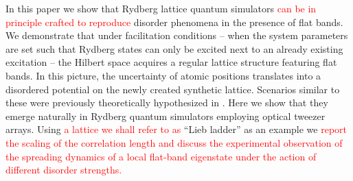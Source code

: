 \documentclass[prl,aps,twocolumn,showpacs,superscriptaddress,longbibliography]{revtex4-1}
\newcommand{\changer}[1]{\textcolor{red}{#1}}
\begin{document}
In this paper we show that Rydberg lattice quantum simulators \cite{Schauss_2015,Labuhn_2015,Bernien2017} \changer{can be in principle crafted to reproduce} disorder phenomena in the presence of flat bands. We demonstrate that under facilitation conditions -- when the system parameters are set such that Rydberg states can only be excited next to an already existing excitation -- the Hilbert space acquires a regular lattice structure featuring flat bands. In this picture, the uncertainty of atomic positions translates into a disordered potential on the newly created synthetic lattice. Scenarios similar to these were previously theoretically hypothesized in \cite{Leykam2017, Bodyfelt2014}. Here we show that they emerge naturally in Rydberg quantum simulators employing optical tweezer arrays. Using \changer{a lattice we shall refer to as} ``Lieb ladder'' as an example we \changer{report the scaling of the correlation length and discuss the experimental observation of the spreading dynamics of a local flat-band eigenstate under the action of different disorder strengths.}
\end{document}
